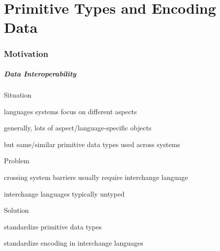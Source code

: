 \documentclass{beamer}
\renewcommand{\emph}[1]{\alert{#1}}
\begin{document}
\part{Primitive Types and Encoding Data}

\section{Motivation}

\begin{frame}\frametitle{Data Interoperability}
\begin{blockitems}{Situation}
 \item languages systems focus on different aspects
 \item generally, lots of aspect/language-specific objects
 \item but same/similar \emph{primitive} data types used across systems
 \end{blockitems}
 
\begin{blockitems}{Problem}
 \item crossing system barriers usually require interchange language
 \item interchange languages typically untyped
\end{blockitems}

\begin{blockitems}{Solution}
 \item standardize primitive data types
 \item standardize encoding in interchange languages
\end{blockitems}
\end{frame}
\end{document}

